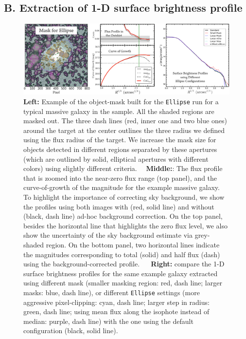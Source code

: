 \documentclass{emulateapj}
\begin{document}
\begin{CJK*}{UTF8}{gbsn}
\section{B. Extraction of 1-D surface brightness profile} 
    \label{app:A}

    \begin{figure}[hbt!]
        \centering 
        \includegraphics[width=\textwidth]{fig/redbcg_ellipse_tech}
        \caption{\textbf{Left:} Example of the object-mask built for the \texttt{Ellipse}
            run for a typical massive galaxy in the sample. 
            All the shaded regions are masked out. 
            The three dash lines (red, inner one and two blue ones) around the target 
            at the center outlines the three radius we defined using the flux radius 
            of the target.  
            We increase the mask size for objects detected in different regions 
            separated by these apertures (which are outlined by solid, elliptical 
            apertures with different colors) using slightly different criteria.~~
            \textbf{Middle:}: The flux profile that is zoomed into the near-zero flux 
            range (top panel), and the curve-of-growth of the magnitude for the example
            massive galaxy.  
            To highlight the importance of correcting sky background, we show the profiles 
            using both images with (red, solid line) and without (black, dash line) 
            ad-hoc background correction. 
            On the top panel, besides the horizontal line that highlights the zero flux 
            level, we also show the uncertainty of the sky background estimate via 
            grey-shaded region.  
            On the bottom panel, two horizontal lines indicate the magnitudes 
            corresponding to total (solid) and half flux (dash) using the 
            background-corrected profile. ~~
            \textbf{Right:} compare the 1-D surface brightness profiles for the same 
            example galaxy extracted using different mask 
            (smaller masking region: red, dash line; larger masks: blue, dash line), 
            or different \texttt{Ellipse} settings
            (more aggressive pixel-clipping: cyan, dash line; 
             larger step in radius: green, dash line; 
             using mean flux along the isophote instead of median: purple, dash line)
            with the one using the default configuration (black, solid line).}
        \label{figure:A1}
    \end{figure}


\end{CJK*}
\end{document}
